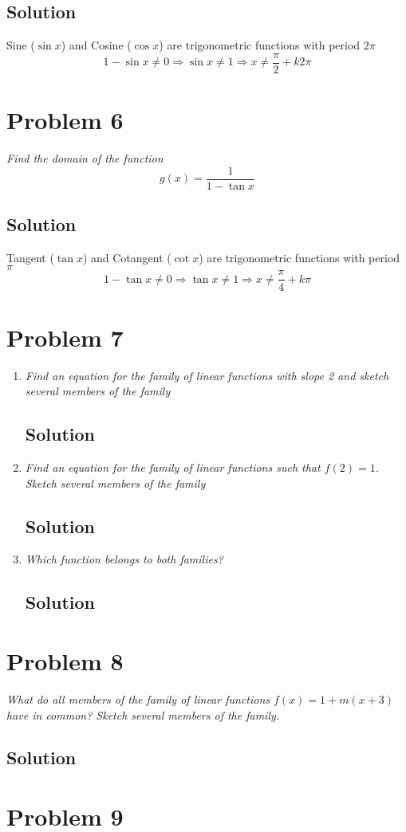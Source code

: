 \documentclass[11pt]{article}
\newcommand{\soln}{\subsection*}
\newcommand{\qn}{\textit}
\begin{document}
\soln{Solution}
Sine ($\sin{x}$) and Cosine ($\cos{x}$) are trigonometric functions with period $2\pi$
\begin{equation*}
	1-\sin{x} \ne 0 \Rightarrow \sin{x} \ne 1 \Rightarrow x \ne \frac{\pi}{2} + k2\pi
\end{equation*}

\section*{Problem 6}

\qn{Find the domain of the function $$g(x)=\frac{1}{1-\tan{x}}$$}

\soln{Solution}
Tangent ($\tan{x}$) and Cotangent ($\cot{x}$) are trigonometric functions with period $\pi$
\begin{equation*}
	1-\tan{x} \ne 0 \Rightarrow \tan{x} \ne 1 \Rightarrow x \ne \frac{\pi}{4} + k\pi
\end{equation*}

\section*{Problem 7}

\begin{enumerate}
	\item \qn{Find an equation for the family of linear functions with slope 2 and sketch several members of the family}
	\soln{Solution}
	
	\item \qn{Find an equation for the family of linear functions such that $f(2)=1$. Sketch several members of the family}
	\soln{Solution}
	
	\item \qn{Which function belongs to both families?}
	\soln{Solution}
\end{enumerate}

\section*{Problem 8}

\qn{What do all members of the family of linear functions $f(x)=1+m(x+3)$ have in common? Sketch several members of the family.}

\soln{Solution}

\section*{Problem 9}
\end{document}

